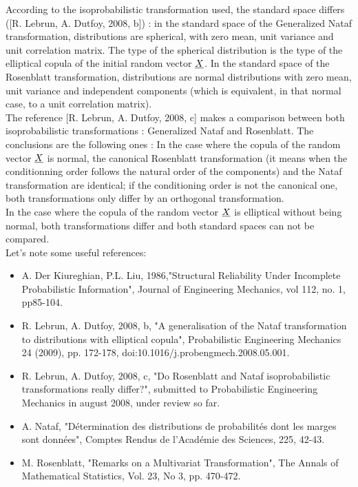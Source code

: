             {
              According to the isoprobabilistic transformation used, the standard space differs ([R. Lebrun, A. Dutfoy, 2008, b]) : in the standard space of the Generalized Nataf transformation, distributions are spherical, with zero mean, unit variance and unit correlation matrix. The type of the spherical distribution is the type of the elliptical copula of the initial random vector ${\underline{X}}$. In the standard space of the Rosenblatt transformation, distributions are normal distributions with zero mean, unit variance and independent components (which is equivalent, in that normal case, to a unit correlation matrix).\\


              The reference [R. Lebrun, A. Dutfoy, 2008, c] makes a comparison between both isoprobabilistic transformations : Generalized Nataf and Rosenblatt.
              The conclusions are the following ones : In the case where the copula of the random vector ${\underline{X}}$ is normal, the canonical Rosenblatt transformation (it means when the conditionning order follows the natural order of the components) and the Nataf transformation are identical; if the conditioning order is not the canonical one, both transformations only differ by an orthogonal transformation.\\
              In the case where the copula of the random vector ${\underline{X}}$ is elliptical without being normal, both transformations differ and both standard spaces can not be compared.\\



              Let's note some useful references:
              \begin{itemize}
              \item A. Der Kiureghian, P.L. Liu, 1986,"Structural Reliability Under Incomplete Probabilistic Information", Journal of Engineering Mechanics, vol 112, no. 1, pp85-104.
              \item R. Lebrun, A. Dutfoy, 2008, b, "A generalisation of the Nataf transformation to distributions with elliptical copula", Probabilistic Engineering Mechanics 24 (2009), pp. 172-178, doi:10.1016/j.probengmech.2008.05.001.
              \item R. Lebrun, A. Dutfoy, 2008, c, "Do Rosenblatt and Nataf isoprobabilistic transformations really differ?", submitted to Probabilistic Engineering Mechanics in august 2008, under review so far.
              \item A. Nataf, "Détermination des distributions de probabilités dont les marges sont données", Comptes Rendus de l'Académie des Sciences, 225, 42-43.
              \item M. Rosenblatt, "Remarks on a Multivariat Transformation", The Annals of Mathematical Statistics, Vol. 23, No 3, pp. 470-472.
              \end{itemize}


            }

